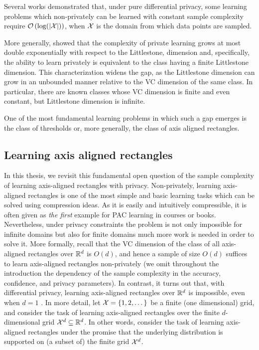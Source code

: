 \documentclass[12pt,a4paper,oneside,onecolumn]{book}
\begin{document}
%
%

Several works demonstrated that, under pure differential privacy, some learning problems which non-privately can be learned  with constant sample complexity require $\mathcal{O}\left(\log(|\mathcal{X}|)\right)$, when $\mathcal{X}$ is the domain from which data points are sampled.

More generally, \citeauthor{BunLM20} showed that the complexity of private learning grows at most double exponentially with respect to the Littlestone, dimension and, specifically, the ability to learn privately is equivalent to the class having a finite Littlestone dimension. This characterization widens the gap, as the Littlestone dimension can grow in an unbounded manner relative to the VC dimension of the same class. In particular, there are known classes whose VC dimension is finite and even constant, but Littlestone dimension is infinite.

One of the most fundamental learning problems in which such a gap emerges is the class of thresholds or, more generally, the class of axis aligned rectangles.

\subsection{Learning axis aligned rectangles}
\label{sec:intro-aar}

In this thesis, we revisit this fundamental open question of the  sample complexity of learning axis-aligned rectangles with privacy.
Non-privately, learning axis-aligned rectangles is one of the most simple and basic learning tasks which can be solved using compression ideas. As it is easily and intuitively compressible, it is often given as {\em the first} example for PAC learning in courses or books.
Nevertheless, under privacy constraints the problem is not only impossible for infinite domains but also for finite domains much more work is needed in order to solve it. 
More formally,
recall that the VC dimension of the class of all axis-aligned rectangles over $\mathbb{R}^d$ is $O(d)$, and hence a sample of size $O(d)$ suffices to learn axis-aligned rectangles non-privately (we omit throughout the introduction the dependency of the sample complexity in the accuracy, confidence, and privacy parameters). In contrast, it turns out that, with differential privacy, learning axis-aligned rectangles over $\mathbb{R}^d$ is impossible, even when $d=1$ \citep{FeldmanX15,BNSV15,AlonLMM19}. In more detail, let $\mathcal{X}=\{1,2,\dots\}$ be a finite (one dimensional) grid, and consider the task of learning axis-aligned rectangles over the finite $d$-dimensional grid $\mathcal{X}^d\subseteq\mathbb{R}^d$. In other words, consider the task of learning axis-aligned rectangles under the promise that the underlying distribution is supported on (a subset of) the finite grid $\mathcal{X}^d$. 
\end{document}
